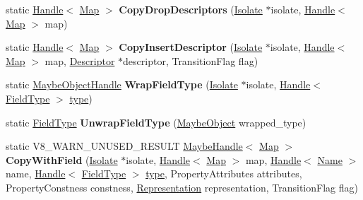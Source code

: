 \begin{DoxyCompactItemize}
\item 
\mbox{\label{classv8_1_1internal_1_1Map_a0ff93f6410d42247776694213fa3eeb0}} 
static \mbox{\hyperlink{classv8_1_1internal_1_1Handle}{Handle}}$<$ \mbox{\hyperlink{classv8_1_1internal_1_1Map}{Map}} $>$ {\bfseries Copy\+Drop\+Descriptors} (\mbox{\hyperlink{classv8_1_1internal_1_1Isolate}{Isolate}} $\ast$isolate, \mbox{\hyperlink{classv8_1_1internal_1_1Handle}{Handle}}$<$ \mbox{\hyperlink{classv8_1_1internal_1_1Map}{Map}} $>$ map)
\item 
\mbox{\label{classv8_1_1internal_1_1Map_a05de943a2e6aeaf151a6385df04a86d9}} 
static \mbox{\hyperlink{classv8_1_1internal_1_1Handle}{Handle}}$<$ \mbox{\hyperlink{classv8_1_1internal_1_1Map}{Map}} $>$ {\bfseries Copy\+Insert\+Descriptor} (\mbox{\hyperlink{classv8_1_1internal_1_1Isolate}{Isolate}} $\ast$isolate, \mbox{\hyperlink{classv8_1_1internal_1_1Handle}{Handle}}$<$ \mbox{\hyperlink{classv8_1_1internal_1_1Map}{Map}} $>$ map, \mbox{\hyperlink{classv8_1_1internal_1_1Descriptor}{Descriptor}} $\ast$descriptor, Transition\+Flag flag)
\item 
\mbox{\label{classv8_1_1internal_1_1Map_a68df54b4a8f576be8618adaca36d1fc0}} 
static \mbox{\hyperlink{classv8_1_1internal_1_1MaybeObjectHandle}{Maybe\+Object\+Handle}} {\bfseries Wrap\+Field\+Type} (\mbox{\hyperlink{classv8_1_1internal_1_1Isolate}{Isolate}} $\ast$isolate, \mbox{\hyperlink{classv8_1_1internal_1_1Handle}{Handle}}$<$ \mbox{\hyperlink{classv8_1_1internal_1_1FieldType}{Field\+Type}} $>$ \mbox{\hyperlink{classstd_1_1conditional_1_1type}{type}})
\item 
\mbox{\label{classv8_1_1internal_1_1Map_ae253d0da7e280acfa71125eec840ff07}} 
static \mbox{\hyperlink{classv8_1_1internal_1_1FieldType}{Field\+Type}} {\bfseries Unwrap\+Field\+Type} (\mbox{\hyperlink{classv8_1_1internal_1_1MaybeObject}{Maybe\+Object}} wrapped\+\_\+type)
\item 
\mbox{\label{classv8_1_1internal_1_1Map_ac999c699a30c844ba07358f283d25a35}} 
static V8\+\_\+\+W\+A\+R\+N\+\_\+\+U\+N\+U\+S\+E\+D\+\_\+\+R\+E\+S\+U\+LT \mbox{\hyperlink{classv8_1_1internal_1_1MaybeHandle}{Maybe\+Handle}}$<$ \mbox{\hyperlink{classv8_1_1internal_1_1Map}{Map}} $>$ {\bfseries Copy\+With\+Field} (\mbox{\hyperlink{classv8_1_1internal_1_1Isolate}{Isolate}} $\ast$isolate, \mbox{\hyperlink{classv8_1_1internal_1_1Handle}{Handle}}$<$ \mbox{\hyperlink{classv8_1_1internal_1_1Map}{Map}} $>$ map, \mbox{\hyperlink{classv8_1_1internal_1_1Handle}{Handle}}$<$ \mbox{\hyperlink{classv8_1_1internal_1_1Name}{Name}} $>$ name, \mbox{\hyperlink{classv8_1_1internal_1_1Handle}{Handle}}$<$ \mbox{\hyperlink{classv8_1_1internal_1_1FieldType}{Field\+Type}} $>$ \mbox{\hyperlink{classstd_1_1conditional_1_1type}{type}}, Property\+Attributes attributes, Property\+Constness constness, \mbox{\hyperlink{classv8_1_1internal_1_1Representation}{Representation}} representation, Transition\+Flag flag)

\end{DoxyCompactItemize}
